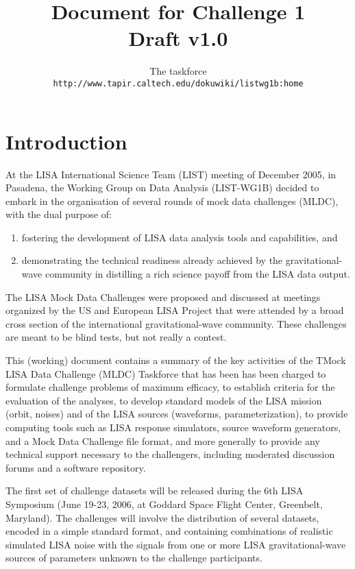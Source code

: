 \documentclass[11pt]{report}
\begin{document}
\title{\bf Document for Challenge 1\\
Draft v1.0}

\author{The taskforce\\
{\tt http://www.tapir.caltech.edu/dokuwiki/listwg1b:home}
}

\maketitle

\chapter{Introduction}

At the LISA International Science Team (LIST) meeting of December 2005, in Pasadena, the Working Group on Data Analysis (LIST-WG1B) decided to embark in the organisation of several rounds of mock data challenges (MLDC), with the dual purpose of:
\begin{enumerate}
\item fostering the development of LISA data analysis tools and capabilities, and 
\item demonstrating the technical readiness already achieved by the gravitational-wave community in distilling a rich science payoff from the LISA data output.
\end{enumerate}
 The LISA Mock Data Challenges were proposed and discussed at meetings organized by the US and European LISA Project that were attended by a broad cross section of the international gravitational-wave community. These challenges are meant to be blind tests, but not really a contest.

This (working) document contains a summary of the key activities of the TMock LISA Data Challenge (MLDC) Taskforce that has been has been charged to formulate challenge problems of maximum efficacy, to establish criteria for the evaluation of the analyses, to develop standard models of the LISA mission (orbit, noises) and of the LISA sources (waveforms, parameterization), to provide computing tools such as LISA response simulators, source waveform generators, and a Mock Data Challenge file format, and more generally to provide any technical support necessary to the challengers, including moderated discussion forums and a software repository. 

The first set of challenge datasets will be released during the 6th LISA Symposium (June 19-23, 2006, at Goddard Space Flight Center, Greenbelt, Maryland). The challenges will involve the distribution of several datasets, encoded in a simple standard format, and containing combinations of realistic simulated LISA noise with the signals from one or more LISA gravitational-wave sources of parameters unknown to the challenge participants.
\end{document}
